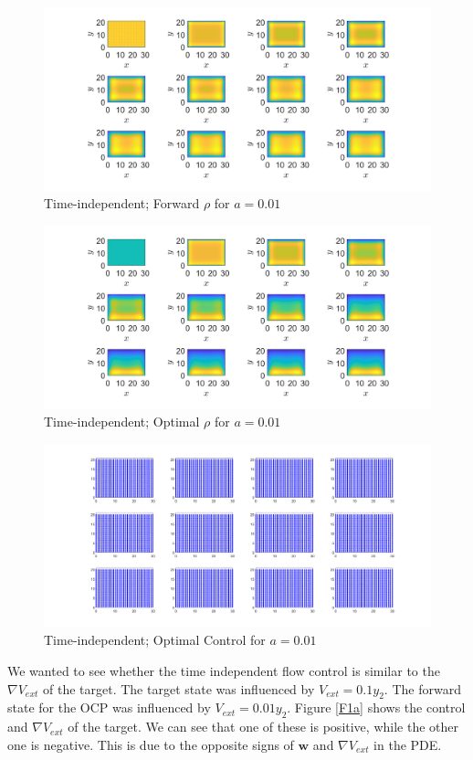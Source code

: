 \documentclass[11pt, a4paper]{article}
\theoremstyle{definition}
\newcommand{\w}{\mathbf{w}}
\begin{document}
\begin{figure}[h]
	\centering
	\includegraphics[scale=0.35]{C1.png}
	\caption{Time-independent; Forward $\rho$ for $a = 0.01$} 
	\label{F6a}
\end{figure}	
\begin{figure}[h]
	\centering
	\includegraphics[scale=0.35]{C2.png}
	\caption{Time-independent; Optimal $\rho$ for $a = 0.01$} 
	\label{F7a}
\end{figure}
\begin{figure}[h]
	\centering
	\includegraphics[scale=0.35]{C3.png}
	\caption{Time-independent; Optimal Control for $a = 0.01$} 
	\label{F8a}
\end{figure}

We wanted to see whether the time independent flow control is similar to the $\nabla V_{ext}$ of the target.
The target state was influenced by $V_{ext} = 0.1 y_2$. The forward state for the OCP was influenced by $V_{ext} = 0.01 y_2$. 
Figure \ref{F1a} shows the control and $\nabla V_{ext}$ of the target. We can see that one of these is positive, while the other one is negative. This is due to the opposite signs of $\w$ and $\nabla V_{ext}$ in the PDE.
\end{document}
